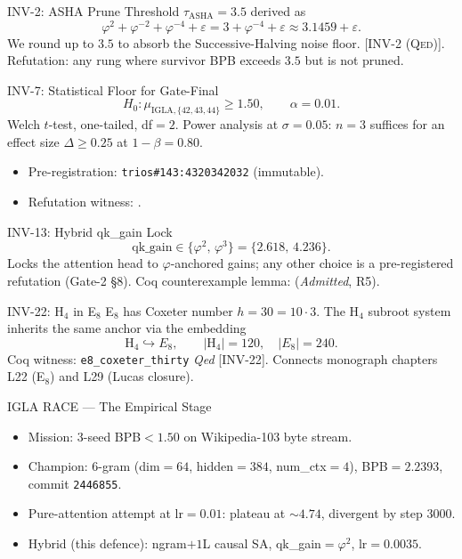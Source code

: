 \documentclass[10pt,aspectratio=169]{beamer}
\newcommand{\citetheorem}[1]{[\textsc{#1}]}
\begin{document}
\begin{frame}{INV-2: ASHA Prune Threshold}
  $\tau_{\mathrm{ASHA}}=3{.}5$ derived as
  \[
    \varphi^{2}+\varphi^{-2}+\varphi^{-4}+\varepsilon=3+\varphi^{-4}+\varepsilon\approx 3{.}1459+\varepsilon.
  \]
  We round up to $3{.}5$ to absorb the Successive-Halving noise floor.
  \citetheorem{INV-2 (Qed)}.
  Refutation: any rung where survivor BPB exceeds $3{.}5$ but is not pruned.
\end{frame}

\begin{frame}{INV-7: Statistical Floor for Gate-Final}
  \[
    H_{0}: \mu_{\mathrm{IGLA},\{42,43,44\}}\geq 1{.}50,\qquad \alpha=0{.}01.
  \]
  Welch $t$-test, one-tailed, df${}=2$. Power analysis at $\sigma=0{.}05$:
  $n=3$ suffices for an effect size $\Delta\geq 0{.}25$ at $1-\beta=0{.}80$.
  \begin{itemize}
    \item Pre-registration: \texttt{trios\#143:4320342032} (immutable).
    \item Refutation witness: .
  \end{itemize}
\end{frame}

\begin{frame}{INV-13: Hybrid qk\_gain Lock}
  \[
    \mathrm{qk\_gain} \in \{\varphi^{2},\,\varphi^{3}\}=\{2{.}618,\,4{.}236\}.
  \]
  Locks the attention head to $\varphi$-anchored gains; any other choice is a
  pre-registered refutation (Gate-2 §8). Coq counterexample lemma:
   (\emph{Admitted}, R5).
\end{frame}

\begin{frame}{INV-22: H$_{4}$ in E$_{8}$}
  E$_{8}$ has Coxeter number $h=30=10\cdot 3$. The H$_{4}$ subroot system inherits
  the same anchor via the embedding
  \[
    \mathrm{H}_{4}\hookrightarrow E_{8},\qquad |\mathrm{H}_{4}|=120,\quad |E_{8}|=240.
  \]
  Coq witness: \texttt{e8\_coxeter\_thirty} \emph{Qed} \citetheorem{INV-22}.
  Connects monograph chapters L22 (E$_{8}$) and L29 (Lucas closure).
\end{frame}

\begin{frame}{IGLA RACE — The Empirical Stage}
  \begin{itemize}
    \item Mission: 3-seed BPB$<\!1{.}50$ on Wikipedia-103 byte stream.
    \item Champion: 6-gram (dim$=64$, hidden$=384$, num\_ctx$=4$), BPB$=2{.}2393$, commit \texttt{2446855}.
    \item Pure-attention attempt at lr$=0{.}01$: plateau at $\sim 4{.}74$, divergent by step 3000.
    \item Hybrid (this defence): ngram$+1$L causal SA, qk\_gain$=\varphi^{2}$, lr$=0{.}0035$.
  \end{itemize}
\end{frame}
\end{document}
